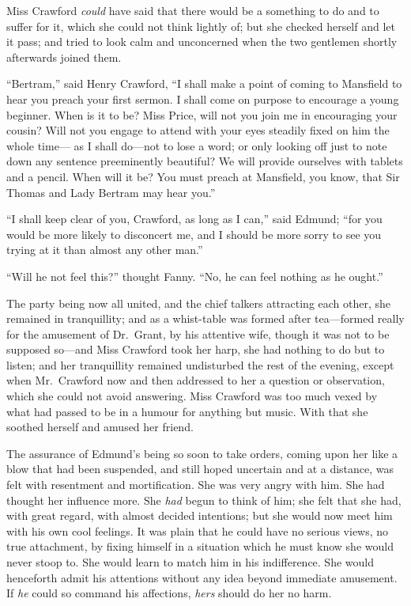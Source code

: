\documentclass{article}
\begin{document}
Miss Crawford \emph{could} have said that there would
be a something to do and to suffer for it, which she
could not think lightly of; but she checked herself
and let it pass; and tried to look calm and unconcerned
when the two gentlemen shortly afterwards joined them.

``Bertram,'' said Henry Crawford, ``I shall make a point of
coming to Mansfield to hear you preach your first sermon.
I shall come on purpose to encourage a young beginner.
When is it to be?  Miss Price, will not you join me in
encouraging your cousin?  Will not you engage to attend
with your eyes steadily fixed on him the whole time---%
as I shall do---not to lose a word; or only looking off
just to note down any sentence preeminently beautiful?
We will provide ourselves with tablets and a pencil.
When will it be?  You must preach at Mansfield, you know,
that Sir Thomas and Lady Bertram may hear you.''

``I shall keep clear of you, Crawford, as long as I can,''
said Edmund; ``for you would be more likely to disconcert me,
and I should be more sorry to see you trying at it than
almost any other man.''

``Will he not feel this?'' thought Fanny.  ``No, he can feel
nothing as he ought.''

The party being now all united, and the chief talkers
attracting each other, she remained in tranquillity;
and as a whist-table was formed after tea---formed really
for the amusement of Dr.\ Grant, by his attentive wife,
though it was not to be supposed so---and Miss Crawford
took her harp, she had nothing to do but to listen;
and her tranquillity remained undisturbed the rest
of the evening, except when Mr.\ Crawford now and then
addressed to her a question or observation, which she
could not avoid answering.  Miss Crawford was too much
vexed by what had passed to be in a humour for anything
but music.  With that she soothed herself and amused
her friend.

The assurance of Edmund's being so soon to take orders,
coming upon her like a blow that had been suspended,
and still hoped uncertain and at a distance, was felt
with resentment and mortification.  She was very angry
with him.  She had thought her influence more.
She \emph{had} begun to think of him; she felt that she had,
with great regard, with almost decided intentions;
but she would now meet him with his own cool feelings.
It was plain that he could have no serious views, no true
attachment, by fixing himself in a situation which he must
know she would never stoop to.  She would learn to match
him in his indifference.  She would henceforth admit his
attentions without any idea beyond immediate amusement.
If \emph{he} could so command his affections, \emph{hers} should do her
no harm.
\end{document}
